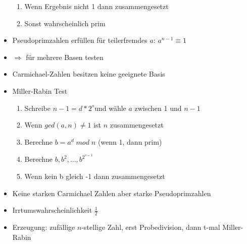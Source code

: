 \documentclass[11pt, paper=a4, twocolumn]{scrartcl}
\begin{document}
\begin{itemize}
\begin{enumerate}
					\item Wenn Ergebnis nicht 1 dann zusammengesetzt
					\item Sonst wahrscheinlich prim
				\end{enumerate}
			\item Pseudoprimzahlen erfüllen für teilerfremdes $a$: $a^{n-1}\equiv1$
			\item $\Rightarrow$ für mehrere Basen testen
			\item Carmichael-Zahlen besitzen keine geeignete Basis
			\item Miller-Rabin Test
				\begin{enumerate}
					\item Schreibe $n-1=d*2^s$und wähle $a$ zwischen 1 und $n-1$ 
					\item Wenn $gcd(a,n)\neq1$ ist $n$ zusammengesetzt
					\item Berechne $b=a^d\;mod\;n$ (wenn 1, dann prim)
					\item Berechne $b,b^2,\dots,b^{2^{s-1}}$
					\item Wenn kein b gleich -1 dann zusammengesetzt
				\end{enumerate}
			\item Keine starken Carmichael Zahlen aber starke Pseudoprimzahlen
			\item Irrtumswahrscheinlichkeit $\frac{1}{2}$
			\item Erzeugung: zufällige $n$-stellige Zahl, erst Probedivision, dann t-mal Miller-Rabin
		\end{itemize}
	
\end{document}
